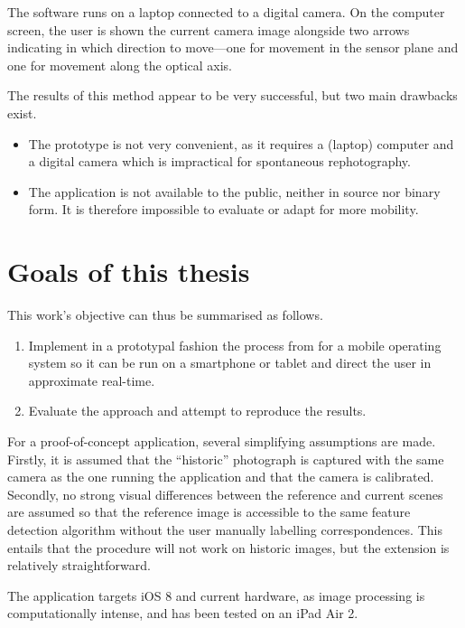 The software runs on a laptop connected to a digital camera. On the computer
screen, the user is shown the current camera image alongside two arrows
indicating in which direction to move---one for movement in the sensor plane and
one for movement along the optical axis.

The results of this method appear to be very successful, but two main drawbacks
exist.

\begin{itemize}
   \item The prototype is not very convenient, as it requires a (laptop)
      computer and a digital camera which is impractical for
      spontaneous rephotography.
   \item The application is not available to the public, neither in source nor
      binary form. It is therefore impossible to evaluate or adapt for more mobility.
\end{itemize}

\section{Goals of this thesis}

This work's objective can thus be summarised as follows.
\begin{enumerate}
   \item Implement in a prototypal fashion the process from \citep{bae2010} for
      a mobile operating system so it can be run on a smartphone or tablet and
      direct the user in approximate real-time.
   \item Evaluate the approach and attempt to reproduce the results.
\end{enumerate}

For a proof-of-concept application, several simplifying assumptions are made.
Firstly, it is assumed that the ``historic'' photograph is captured with the
same camera as the one running the application and that the camera is calibrated.
Secondly, no strong visual differences between the reference and current scenes
are assumed so that the reference image is accessible to the same feature
detection algorithm without the user manually labelling correspondences. This
entails that the procedure will not work on historic images, but the extension
is relatively straightforward.

The application targets iOS 8 and current hardware, as image processing is
computationally intense, and has been tested on an iPad Air 2.
